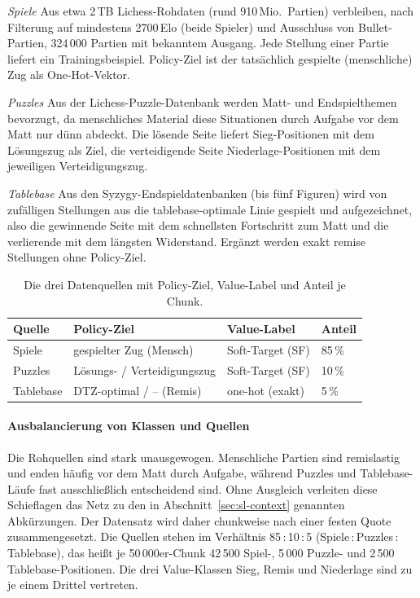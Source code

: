 \documentclass[
  a4paper, 12pt,
  parskip=half,
  headings=small,
  bibliography=totoc
]{scrartcl}
\begin{document}
\emph{Spiele} Aus etwa 2\,TB Lichess-Rohdaten (rund 910\,Mio.\ Partien)
verbleiben, nach Filterung auf mindestens 2700\,Elo (beide Spieler) und Ausschluss von
Bullet-Partien, 324\,000 Partien mit bekanntem Ausgang. Jede Stellung einer Partie
liefert ein Trainingsbeispiel. Policy-Ziel ist der tatsächlich gespielte
(menschliche) Zug als One-Hot-Vektor.

\emph{Puzzles} Aus der Lichess-Puzzle-Datenbank werden Matt- und Endspielthemen
bevorzugt, da menschliches Material diese Situationen durch Aufgabe vor dem Matt
nur dünn abdeckt. Die lösende Seite liefert Sieg-Positionen mit dem Lösungszug als Ziel, die
verteidigende Seite Niederlage-Positionen mit dem jeweiligen Verteidigungszug.

\emph{Tablebase} Aus den Syzygy-Endspieldatenbanken (bis fünf Figuren) wird von
zufälligen Stellungen aus die tablebase-optimale Linie gespielt und aufgezeichnet,
also die gewinnende Seite mit dem schnellsten Fortschritt zum Matt und die
verlierende mit dem längsten Widerstand. Ergänzt werden exakt remise Stellungen ohne Policy-Ziel.

\begin{table}[htbp]
  \centering
  \begin{tabular}{llll}
    \toprule
    Quelle & Policy-Ziel & Value-Label & Anteil \\
    \midrule
    Spiele    & gespielter Zug (Mensch)       & Soft-Target (SF) & 85\,\% \\
    Puzzles   & Lösungs- / Verteidigungszug   & Soft-Target (SF) & 10\,\% \\
    Tablebase & DTZ-optimal / -- (Remis)      & one-hot (exakt) & 5\,\% \\
    \bottomrule
  \end{tabular}
  \caption{Die drei Datenquellen mit Policy-Ziel, Value-Label und Anteil je Chunk.}
  \label{tab:sources}
\end{table}

\paragraph{Ausbalancierung von Klassen und Quellen}
Die Rohquellen sind stark unausgewogen. Menschliche Partien sind remislastig und
enden häufig vor dem Matt durch Aufgabe, während Puzzles und Tablebase-Läufe fast
ausschließlich entscheidend sind. Ohne Ausgleich verleiten diese Schieflagen das
Netz zu den in Abschnitt~\ref{sec:sl-context} genannten Abkürzungen. Der Datensatz
wird daher chunkweise nach einer festen Quote zusammengesetzt. Die Quellen stehen
im Verhältnis 85\,:\,10\,:\,5 (Spiele\,:\,Puzzles\,:\,Tablebase), das heißt je
50\,000er-Chunk 42\,500 Spiel-, 5\,000 Puzzle- und 2\,500 Tablebase-Positionen. Die
drei Value-Klassen Sieg, Remis und Niederlage sind zu je einem Drittel vertreten.
\end{document}
